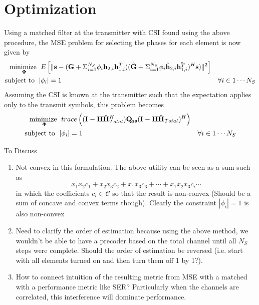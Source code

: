 \documentclass[12pt,a4paper]{report}
\begin{document}
\section{Optimization}
Using a matched filter at the transmitter with CSI found using the above procedure, the MSE problem for selecting the phases for each element is now given by
	\begin{subequations}
	\label{optim}
	\begin{align}
	    \underset{\boldsymbol{\Phi}}{\text{minimize }}
	    & \; E\left[\|  \mathbf{s} - (\mathbf{G} + \Sigma_{i=1}^{N_S} \phi_i \mathbf{h}_{2,i}\mathbf{h}^T_{1,i})(\hat{\mathbf{G}} + \Sigma_{i=1}^{N_S} \phi_i \hat{\mathbf{h}}_{2,i}\hat{\mathbf{h}^T_{1,i}})^H\mathbf{s}) \|^2 \right]\\
	    \text{subject to  } \; &
	    | \phi_i | = 1 & \forall i \in {1 \cdots	 N_S}
	\end{align}
	\end{subequations}	
	Assuming the CSI is known at the transmitter such that the expectation applies only to the transmit symbols, this problem becomes
	\begin{subequations}
	\label{optim}
	\begin{align}
	    \underset{\boldsymbol{\Phi}}{\text{minimize }}
	    & \; trace\left((\mathbf{I} - \mathbf{H}\hat{\mathbf{H}}_{Total}^H) \mathbf{Q}_{\mathbf{s}\mathbf{s}} 
	    (\mathbf{I} - \mathbf{H}\hat{\mathbf{H}}_{Total}) ^H\right)
	     \\
	    \text{subject to  } \; &
	    | \phi_i | = 1 & \forall i \in {1 \cdots	 N_S}
	\end{align}
	\end{subequations}		
	
	To Discuss
	\begin{enumerate}
	\item
		Not convex in this formulation. The above utility can be seen as a sum such as 
		\begin{equation}
		 x_1x_2 c_1 + x_2x_3c_2 + x_1x_3c_3 + \cdots + x_1x_2x_3c_i \cdots
		\end{equation}
		in which the coefficients $c_i \in \mathcal{C}$ so that the result is non-convex (Should be a sum of concave and convex terms though).
		Clearly the constraint $ | \phi_i | = 1$ is also non-convex
	\item
		Need to clarify the order of estimation because using the above method, we wouldn't be able to have a precoder based on the total channel until all $N_S$ steps were 					complete.	Should the order of estimation be reversed (i.e. start with all elements turned on and then turn them off 1 by 1?).
	\item
		How to connect intuition of the resulting metric from MSE with a matched with a performance metric like SER?
		Particularly when the channels are correlated, this interference will dominate performance.
	\end{enumerate}

\end{document}
